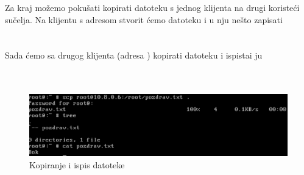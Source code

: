        Za kraj možemo pokušati kopirati datoteku s jednog klijenta na drugi
        koristeći  sučelja. Na klijentu s adresom 
        stvorit ćemo datoteku  i u nju nešto zapisati \\ 

        \noindent
         \\
         \\

        \noindent
        Sada ćemo sa drugog klijenta (adresa ) kopirati
         datoteku i ispistai ju \\
         \\
        \\

        \begin{figure}[H]
            \centering
            \includegraphics[scale=0.45]{slike/pozdrav}
            \caption{Kopiranje i ispis datoteke }
        \end{figure}
